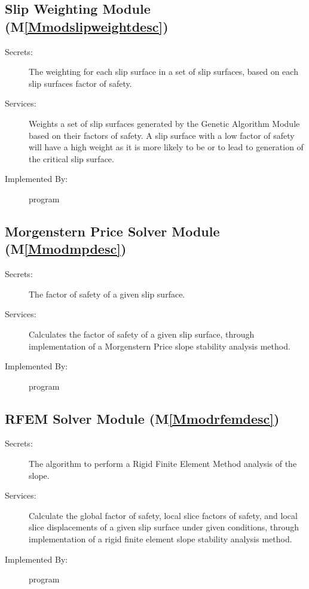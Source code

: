 \documentclass[12pt]{article}
\begin{document}
\subsection{Slip Weighting Module (M\ref{Mmodslipweightdesc})}
\label{Sec:SWM()}
\begin{description}
\item[Secrets:]The weighting for each slip surface in a set of slip surfaces, based on each slip surfaces factor of safety.
\item[Services:]Weights a set of slip surfaces generated by the Genetic Algorithm Module based on their factors of safety. A slip surface with a low factor of safety will have a high weight as it is more likely to be or to lead to generation of the critical slip surface.
\item[Implemented By:]program
\end{description}
\subsection{Morgenstern Price Solver Module (M\ref{Mmodmpdesc})}
\label{Sec:MPSM()}
\begin{description}
\item[Secrets:]The factor of safety of a given slip surface.
\item[Services:]Calculates the factor of safety of a given slip surface, through implementation of a Morgenstern Price slope stability analysis method.
\item[Implemented By:]program
\end{description}
\subsection{RFEM Solver Module (M\ref{Mmodrfemdesc})}
\label{Sec:RSM()}
\begin{description}
\item[Secrets:]The algorithm to perform a Rigid Finite Element Method analysis of the slope.
\item[Services:]Calculate the global factor of safety, local slice factors of safety, and local slice displacements of a given slip surface under given conditions, through implementation of a rigid finite element slope stability analysis method.
\item[Implemented By:]program
\end{description}
\end{document}
